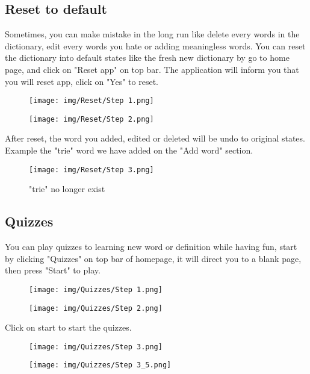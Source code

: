 \documentclass[sn-mathphys,Numbered]{sn-jnl}%
\begin{document}
\subsection{Reset to default}

Sometimes, you can make mistake in the long run like delete every words in the dictionary, edit every words you hate or adding meaningless words. You can reset the dictionary into default states like the fresh new dictionary by go to home page, and click on "Reset app" on top bar. The application will inform you that you will reset app, click on "Yes" to reset.

\begin{figure}[H]
	\centering
	\begin{minipage}{0.49\textwidth}
		\texttt{[image: img/Reset/Step 1.png]}
	\end{minipage}\hfill
	\begin{minipage}{0.49\textwidth}
		\texttt{[image: img/Reset/Step 2.png]}
	\end{minipage}
\end{figure}

After reset, the word you added, edited or deleted will be undo to original states. Example the "trie" word we have added on the "Add word" section.

\begin{figure}[H]
	\centering
	\texttt{[image: img/Reset/Step 3.png]}
	\caption*{"trie" no longer exist}
\end{figure}

\subsection{Quizzes}

You can play quizzes to learning new word or definition while having fun, start by clicking "Quizzes" on top bar of homepage, it will direct you to a blank page, then press "Start" to play.

\begin{figure}[H]
	\centering
	\begin{minipage}{0.49\textwidth}
		\texttt{[image: img/Quizzes/Step 1.png]}
	\end{minipage}\hfill
	\begin{minipage}{0.49\textwidth}
		\texttt{[image: img/Quizzes/Step 2.png]}
	\end{minipage}
\end{figure}

Click on start to start the quizzes.

\begin{figure}[H]
	\centering
	\begin{minipage}{0.49\textwidth}
		\texttt{[image: img/Quizzes/Step 3.png]}
	\end{minipage}\hfill
	\begin{minipage}{0.49\textwidth}
		\texttt{[image: img/Quizzes/Step 3\_5.png]}
	\end{minipage}
\end{figure}
\end{document}
